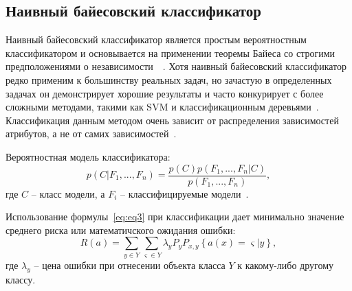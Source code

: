 \subsection{Наивный байесовский классификатор}
Наивный байесовский классификатор является простым вероятностным классификатором и основывается на применении теоремы Байеса со строгими предположениями о независимости~\cite{potapov}~\cite{danilovsv}. Хотя наивный байесовский классификатор редко применим к большинству реальных задач, но зачастую в определенных задачах он демонстрирует хорошие результаты и часто конкурирует с более сложными методами, такими как SVM и классификационным деревьями~\cite{Mirmozaffari}. Классификация данным методом очень зависит от распределения зависимостей атрибутов, а не от самих зависимостей~\cite{juravlev}.
\par
Вероятностная модель классификатора:
\begin{equation}\label{eq:eq3}
p(C|F_{1},...,F_{n}) = \frac{p(C)p(F_{1},...,F_{n}|C)}{p(F_{1},...,F_{n})},
\end{equation}
где $C$ -- класс модели, а $F_{i}$ -- классифицируемые модели~\cite{Mirmozaffari}.
\par
Использование формулы~\eqref{eq:eq3} при классификации дает минимально значение среднего риска или математичского ожидания ошибки:
\begin{equation}\label{eq:eq4}
R(a) = \sum_{y\in Y}\sum_{\varsigma\in Y}\lambda_{y}P_{y}P_{x,y}\left\lbrace a(x)=\varsigma|y \right\rbrace ,
\end{equation}
где $\lambda_{y}$ -- цена ошибки при отнесении объекта класса $Y$ к какому-либо другому классу.

